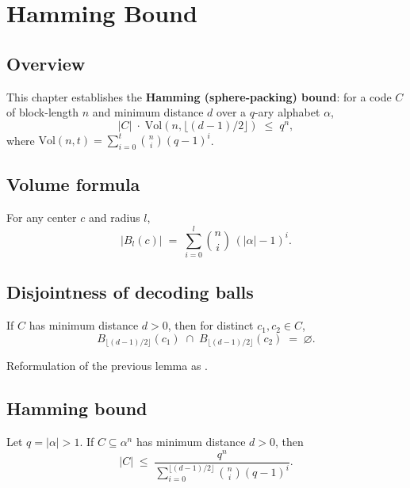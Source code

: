 \chapter{Hamming Bound}
\section{Overview}

This chapter establishes the \textbf{Hamming (sphere-packing) bound}: for a code $C$
of block-length $n$ and minimum distance $d$ over a $q$-ary alphabet $\alpha$,
\[
|C| \;\cdot\; \mathrm{Vol}(n,\lfloor(d-1)/2\rfloor)
\;\le\; q^n,
\]
where $\mathrm{Vol}(n,t) = \sum_{i=0}^{t}\binom{n}{i}(q-1)^i$.

\section{Volume formula}

\begin{theorem}
\leanok
For any center $c$ and radius $l$,
\[
|B_l(c)| \;=\; \sum_{i=0}^{l} \binom{n}{i}\,(|\alpha|-1)^i.
\]
\end{theorem}

\section{Disjointness of decoding balls}

\begin{lemma}
\leanok
{}
If $C$ has minimum distance $d>0$, then for distinct $c_1,c_2\in C$,
\[
B_{\lfloor(d-1)/2\rfloor}(c_1)
\;\cap\;
B_{\lfloor(d-1)/2\rfloor}(c_2)
\;=\;\varnothing.
\]
\end{lemma}

\begin{lemma}
\leanok
{}
Reformulation of the previous lemma as .
\end{lemma}

\section{Hamming bound}

\begin{theorem}
\leanok
{}
Let $q=|\alpha|>1$.  If $C\subseteq\alpha^n$ has minimum distance $d>0$, then
\[
|C|
\;\le\;
\frac{q^n}{\displaystyle\sum_{i=0}^{\lfloor(d-1)/2\rfloor}\binom{n}{i}(q-1)^i}.
\]
\end{theorem}
